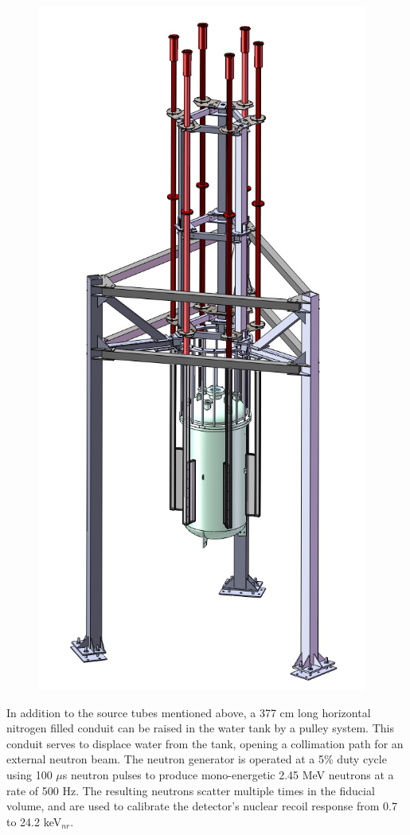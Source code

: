 \begin{figure} [!h]
\includegraphics[scale=.35]{LuxSourceTubes.png} 
\label{LuxSourceTubes}
\end{figure}

In addition to the source tubes mentioned above, a 377 cm long horizontal nitrogen filled conduit can be raised in the water tank by a pulley system.   This conduit serves to displace water from the tank, opening a collimation path for an external neutron beam.  The neutron generator is operated at a 5\% duty cycle using 100 $\mu$s neutron pulses to produce mono-energetic 2.45 MeV neutrons at a rate of 500 Hz. The resulting neutrons scatter multiple times in the fiducial volume, and are used to calibrate the detector's nuclear recoil response from 0.7 to 24.2 keV$_{nr}$.


